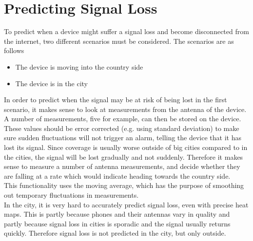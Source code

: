 \section{Predicting Signal Loss}
To predict when a device might suffer a signal loss and become disconnected from the internet, two different scenarios must be considered. The scenarios are as follows\\

\begin{itemize}
\item The device is moving into the country side
\item The device is in the city
\end{itemize}

In order to predict when the signal may be at risk of being lost in the first scenario, it makes sense to look at measurements from the antenna of the device. A number of measurements, five for example, can then be stored on the device. These values should be error corrected (e.g. using standard deviation) to make sure sudden fluctuations will not trigger an alarm, telling the device that it has lost its signal. Since coverage is usually worse outside of big cities compared to in the cities, the signal will be lost gradually and not suddenly. Therefore it makes sense to measure a number of antenna measurements, and decide whether they are falling at a rate which would indicate heading towards the country side.\\

This functionality uses the moving average, which has the purpose of smoothing out temporary fluctuations in measurements. \citep{wiki-moving-average}\\

In the city, it is very hard to accurately predict signal loss, even with precise heat maps. This is partly because phones and their antennas vary in quality and partly because signal loss in cities is sporadic and the signal usually returns quickly. Therefore signal loss is not predicted in the city, but only outside. 